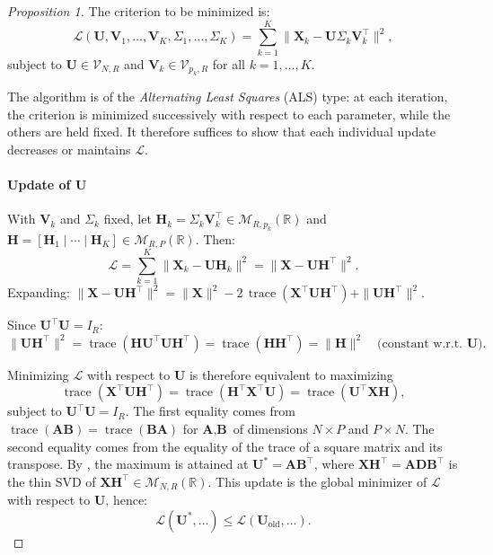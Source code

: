\documentclass[11pt]{article}
\DeclareMathOperator{\trace}{\mathrm{trace}}
\newcommand{\X}{\mathbf{X}}
\newcommand{\U}{\mathbf{U}}
\newcommand{\V}{\mathbf{V}}
\newcommand{\HH}{\mathbf{H}}
\newcommand{\Stiefel}[2]{\mathcal V_{#1,#2}}
\begin{document}
\begin{proof}[Proposition 1]
	The criterion to be minimized is:
\[
  \mathcal{L}(\U, \V_1, \ldots, \V_K, \Sigma_1, \ldots, \Sigma_K)
  = \sum_{k=1}^{K} \bigl\| \X_k - \U \Sigma_k \V_k^\top \bigr\|^2,
\]
subject to $\U\in\Stiefel{N}{R}$ and $\V_k\in \Stiefel{p_k}{R}$ for all $k = 1, \ldots, K$.

The algorithm is of the \emph{Alternating Least Squares} (ALS) type: at each iteration, the criterion is minimized successively with respect to each parameter, while the others are held fixed. It therefore suffices to show that each individual update decreases or maintains $\mathcal{L}$.

\paragraph{Update of $\U$} With $\V_k$ and $\Sigma_k$ fixed, let $\HH_k = \Sigma_k \V_k^\intercal \in \mathcal{M}_{R,p_k}(\mathbb{R})$ and
$\HH = [\HH_1 \mid \cdots \mid \HH_K] \in \mathcal{M}_{R,P}(\mathbb{R})$. Then:
\[
  \mathcal{L} = \sum_{k=1}^{K} \|\X_k - \U \HH_k\|^2 = \|\X - \U \HH^\intercal\|^2.
\]
Expanding:
$\|\X - \U \HH^\intercal\|^2
  = \|\X\|^2 - 2\,\operatorname{trace}(\X^\intercal \U \HH^\intercal) + \|\U \HH^\intercal\|^2.$

\noindent Since $\U^\intercal \U = I_R$: $\|\U \HH^\intercal\|^2
  = \operatorname{trace}(\HH \U^\intercal \U \HH^\intercal)
  = \operatorname{trace}(\HH \HH^\intercal)
  = \|\HH\|^2 \quad \text{(constant w.r.t.\ } \U\text{)}.$

\noindent Minimizing $\mathcal{L}$ with respect to $\U$ is therefore equivalent to
maximizing $$\trace(\X^\intercal\U\HH^\intercal)=\trace(\HH^\intercal\X^\intercal\U)=\trace(\U^\intercal\X\HH),$$
subject to $\U^\intercal \U = I_R$. The first equality comes from $\trace(\textbf{A}\textbf{B})=\trace(\textbf{B}\textbf{A})$ for $\textbf{A},\textbf{B}$ of dimensions $N\times P$ and $P\times N$. The second equality comes from the equality of the trace of a square matrix and its transpose. By \cite{cliff1966}, the maximum is attained at $\U^* = \mathbf A\mathbf B^\intercal$, where $\X\HH^\intercal=\mathbf A\mathbf D\mathbf B^\intercal$ is the thin SVD of $\X\HH^\intercal\in\mathcal M_{N,R}(\mathbb R)$.
This update is the global minimizer of $\mathcal{L}$ with respect to $\U$, hence:
\[
  \mathcal{L}(\U^*, \ldots) \leq \mathcal{L}(\U_{\mathrm{old}}, \ldots).
\]

\end{proof}
\end{document}
